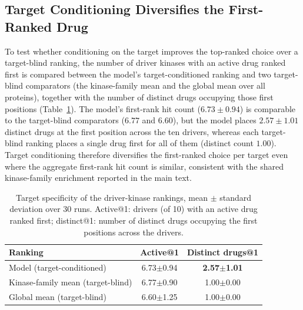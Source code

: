 \documentclass[11pt,letterpaper]{article}
\begin{document}
\subsection{Target Conditioning Diversifies the First-Ranked Drug}
\label{sec:target_specificity}
To test whether conditioning on the target improves the top-ranked choice over a target-blind ranking, the number of driver kinases with an active drug ranked first is compared between the model's target-conditioned ranking and two target-blind comparators (the kinase-family mean and the global mean over all proteins), together with the number of distinct drugs occupying those first positions (Table~\ref{tab:target_specificity}). The model's first-rank hit count ($6.73\pm0.94$) is comparable to the target-blind comparators ($6.77$ and $6.60$), but the model places $2.57\pm1.01$ distinct drugs at the first position across the ten drivers, whereas each target-blind ranking places a single drug first for all of them (distinct count $1.00$). Target conditioning therefore diversifies the first-ranked choice per target even where the aggregate first-rank hit count is similar, consistent with the shared kinase-family enrichment reported in the main text.

\begin{table}[!t]
\centering
\caption{Target specificity of the driver-kinase rankings, mean $\pm$ standard deviation over 30 runs. Active@1: drivers (of 10) with an active drug ranked first; distinct@1: number of distinct drugs occupying the first positions across the drivers.}
\label{tab:target_specificity}
\small
\begin{tabular}{lcc}
\toprule
\textbf{Ranking} & \textbf{Active@1} & \textbf{Distinct drugs@1} \\
\midrule
Model (target-conditioned) & 6.73$\pm$0.94 & \textbf{2.57$\pm$1.01} \\
Kinase-family mean (target-blind) & 6.77$\pm$0.90 & 1.00$\pm$0.00 \\
Global mean (target-blind) & 6.60$\pm$1.25 & 1.00$\pm$0.00 \\
\bottomrule
\end{tabular}
\end{table}
\end{document}
